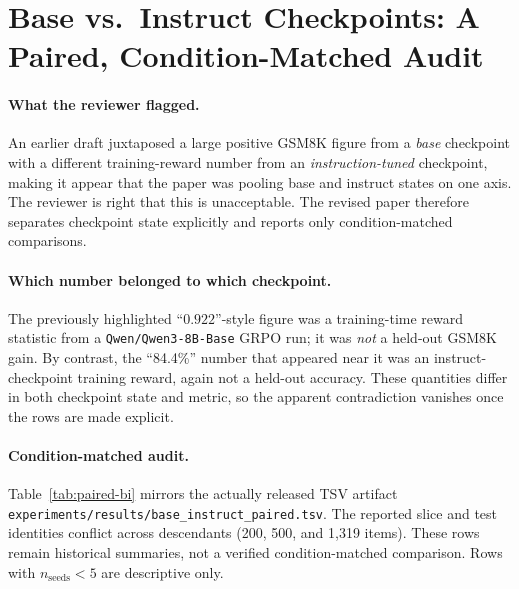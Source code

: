 
\section{Base vs.\ Instruct Checkpoints: A Paired, Condition-Matched Audit}
\label{sec:base-instruct-paired}

\paragraph{What the reviewer flagged.}
An earlier draft juxtaposed a large positive GSM8K figure from a
\emph{base} checkpoint with a different training-reward number from an
\emph{instruction-tuned} checkpoint, making it appear that the paper was
pooling base and instruct states on one axis. The reviewer is right that
this is unacceptable. The revised paper therefore separates checkpoint
state explicitly and reports only condition-matched comparisons.

\paragraph{Which number belonged to which checkpoint.}
The previously highlighted ``$0.922$''-style figure was a
training-time reward statistic from a \texttt{Qwen/Qwen3-8B-Base} GRPO run;
it was \emph{not} a held-out GSM8K gain. By contrast, the ``84.4\%''
number that appeared near it was an instruct-checkpoint training reward,
again not a held-out accuracy. These quantities differ in both checkpoint
state and metric, so the apparent contradiction vanishes once the rows are
made explicit.

\paragraph{Condition-matched audit.}
Table~\ref{tab:paired-bi} mirrors the actually released TSV artifact
\texttt{experiments/results/base\_instruct\_paired.tsv}. The reported slice and test identities conflict across descendants (200, 500,
and 1,319 items). These rows remain historical summaries, not a verified
condition-matched comparison. Rows with $n_{\text{seeds}}<5$ are descriptive only.

